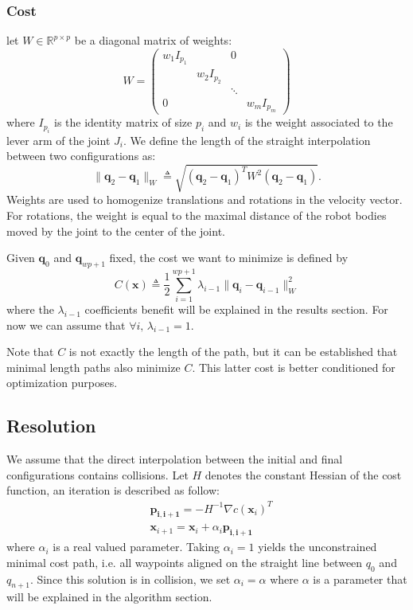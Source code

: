 \documentclass{tADR2e}
\newcommand\real{\mathbb{R}}
\newcommand\pii{\mathbf{p_{i,i+1}}}
\newcommand\conf{\mathbf{q}}
\newcommand\xx{\mathbf{x}} %
\newcommand\cost{C}
\begin{document}
\subsubsection {Cost}

let $W\in\real^{p\times p}$ be a diagonal matrix of weights:
$$
W=\left(\begin{array}{cccccccccc}
w_1 I_{p_1}       &        &  0  \\
    & w_2 I_{p_2} &        &   \\
    &            & \ddots &   \\
  0 &            &        & w_m I_{p_m}
\end{array}\right)
$$
where $I_{p_i}$ is the identity matrix of size $p_i$ and $w_i$ is the weight 
associated to the lever arm of the joint $J_i$. We define the length of the straight interpolation 
between two configurations as:
$$
\|\conf_2 - \conf_1\|_{W} \triangleq \sqrt{(\conf_2 - \conf_1)^T W^2 (\conf_2 - 
\conf_1)}.
$$
Weights are used to homogenize translations and rotations in the velocity vector. 
For rotations, the weight is equal to the maximal distance of the robot bodies 
moved by the joint to the center of the joint.

Given $\conf_0$ and $\conf_{wp+1}$ fixed, the cost we want to minimize is defined 
by
$$
\cost (\xx) \triangleq \frac{1}{2}\sum_{i=1}^{wp+1} \lambda_{i-1} \|\conf_{i}-\conf_{i-1}\|_{W}
^{2}
$$
where the $\lambda_{i-1}$ coefficients benefit will be explained in the results 
section. For now we can assume that $\forall i,\, \lambda_{i-1}=1$.

Note that $\cost$ is not exactly the length of the path, but it can be 
established that minimal length paths also minimize $\cost$. This latter cost is 
better conditioned for optimization purposes.

\subsection {Resolution}
We assume that the direct interpolation between the initial and final configurations contains collisions.
Let $H$ denotes the constant Hessian of the cost function, an iteration is 
described as follow:
\begin{equation}\label{eq:iteration-1}
\begin{split}
& \pii =  -H^{-1} \nabla c(\xx_i)^{T} \\
& \xx_{i+1} =  \xx_{i} + \alpha_i \pii
\end{split} 
\end{equation}
where $\alpha_i$ is a real valued parameter. Taking $\alpha_i=1$ yields the 
unconstrained minimal cost path, i.e. all waypoints aligned on the straight line 
between $q_0$ and $q_{n+1}$. Since this solution is in collision, we set 
$\alpha_i = \alpha$ 
where $\alpha$ is a parameter that will be explained in the algorithm section.
\end{document}
